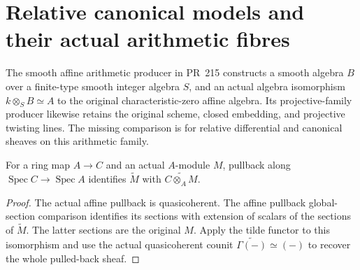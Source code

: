 \section{Relative canonical models and their actual arithmetic fibres}

The smooth affine arithmetic producer in PR~215 constructs a smooth algebra
$B$ over a finite-type smooth integer algebra $S$, and an actual algebra
isomorphism $k\otimes_S B\simeq A$ to the original characteristic-zero affine
algebra.  Its projective-family producer likewise retains the original scheme,
closed embedding, and projective twisting lines.  The missing comparison is
for relative differential and canonical sheaves on this arithmetic family.

\begin{lemma}
\label{lem:kn-arithmetic-affine-tilde-pullback}
\leanok
For a ring map $A\to C$ and an actual $A$-module $M$, pullback along
$\operatorname{Spec}C\to\operatorname{Spec}A$ identifies $\widetilde M$ with
$\widetilde{C\otimes_A M}$.
\end{lemma}
\begin{proof}
The actual affine pullback is quasicoherent.  The affine pullback global-section
comparison identifies its sections with extension of scalars of the sections
of $\widetilde M$.  The latter sections are the original $M$.  Apply the tilde
functor to this isomorphism and use the actual quasicoherent counit
$\widetilde{\Gamma(-)}\simeq(-)$ to recover the whole pulled-back sheaf.
\end{proof}

